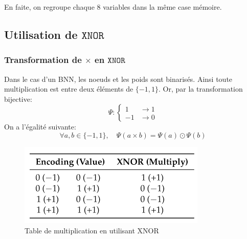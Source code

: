 En faite, on regroupe chaque $8$ variables dans la même case mémoire.

\subsection{Utilisation de $\mathtt{XNOR}$}
\subsubsection{Transformation de $\times$ en $\mathtt{XNOR}$}
Dans le cas d'un BNN, les noeuds et les poids sont binarisés. Ainsi toute multiplication est entre deux éléments de $\{-1,1\}.$
\newline Or, par la transformation bijective: 
$$\Psi:\begin{cases}
	1 &\rightarrow 1 \\
	-1 &\rightarrow 0
	\end{cases}$$
On a l'égalité suivante:
$$
\forall a,b\in\{-1,1\},\quad \Psi(a\times b) = \Psi(a)\odot \Psi(b) 
$$
\begin{figure}[h!]
	\centering
	\includegraphics[width=.5\textwidth]{Figures/XNOR-Table.png}
	\caption{Table de multiplication en utilisant XNOR}
	\label{fig:XNOR-Table}
\end{figure}
\FloatBarrier
